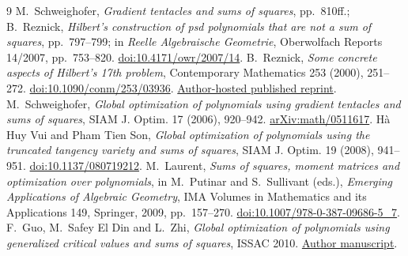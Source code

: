 \documentclass[11pt]{article}
\begin{document}
\begin{thebibliography}{9}
M.~Schweighofer, \emph{Gradient tentacles and sums of squares}, pp.~810ff.;
B.~Reznick, \emph{Hilbert's construction of psd polynomials that are not a sum
of squares}, pp.~797--799; in \emph{Reelle Algebraische Geometrie},
Oberwolfach Reports 14/2007, pp.~753--820.
\href{https://doi.org/10.4171/owr/2007/14}{doi:10.4171/owr/2007/14}.
B.~Reznick, \emph{Some concrete aspects of Hilbert's 17th problem},
Contemporary Mathematics 253 (2000), 251--272.
\href{https://doi.org/10.1090/conm/253/03936}{doi:10.1090/conm/253/03936}.
\href{https://reznick.web.illinois.edu/Paper34.pdf}{Author-hosted published reprint}.
M.~Schweighofer, \emph{Global optimization of polynomials using gradient
tentacles and sums of squares}, SIAM J. Optim. 17 (2006), 920--942.
\href{https://arxiv.org/abs/math/0511617}{arXiv:math/0511617}.
H\`a Huy Vui and Pham Tien Son, \emph{Global optimization of polynomials using
the truncated tangency variety and sums of squares}, SIAM J. Optim. 19 (2008),
941--951. \href{https://doi.org/10.1137/080719212}{doi:10.1137/080719212}.
M.~Laurent, \emph{Sums of squares, moment matrices and optimization over
polynomials}, in M.~Putinar and S.~Sullivant (eds.), \emph{Emerging Applications
of Algebraic Geometry}, IMA Volumes in Mathematics and its Applications 149,
Springer, 2009, pp.~157--270.
\href{https://doi.org/10.1007/978-0-387-09686-5_7}{doi:10.1007/978-0-387-09686-5\_7}.
F.~Guo, M.~Safey El Din and L.~Zhi, \emph{Global optimization of polynomials
using generalized critical values and sums of squares}, ISSAC 2010.
\href{https://perso.lip6.fr/Mohab.Safey/Articles/gcv_sos.pdf}{Author manuscript}.
\end{thebibliography}
\end{document}
